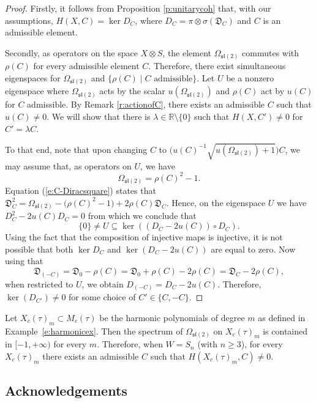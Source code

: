 \documentclass[pdftex]{sigma}
\numberwithin{equation}{section}
\newcommand{\fD}{\mathfrak{D}}
\newcommand{\bbr}{\mathbb{R}}
\begin{document}
\begin{proof}
Firstly, it follows from Proposition \ref{p:unitarycoh} that, with our assumptions, $H(X,C) = \ker D_C$, where $D_C = \pi\otimes\sigma(\fD_C)$ and $C$ is an admissible element.

Secondly, as operators on the space $X \otimes S$, the element $\Omega_{\mathfrak{sl}(2)}$ commutes with $\rho(C)$ for every admissible element $C$. Therefore, there exist simultaneous eigenspaces for $\Omega_{\mathfrak{sl}(2)}$ and $\{\rho(C) \mid C \text{ admissible}\}$. Let $U$ be a nonzero eigenspace where $\Omega_{\mathfrak{sl}(2)}$ acts by the scalar $u(\Omega_{\mathfrak{sl}(2)})$ and $\rho(C)$ act by $u(C)$ for $C$ admissible. By Remark \ref{r:actionofC}, there exists an admissible $C$ such that $u(C)\neq 0$. We will show that there is $\lambda \in \bbr\setminus \{0\}$ such that $H(X,C')\neq 0$ for $C' = \lambda C$.

To that end, note that upon changing $C$ to $\big(u(C)^{-1}\sqrt{u(\Omega_{\mathfrak{sl}(2)})+1}\big)C$, we may assume that, as operators on $U$, we have
\[\Omega_{\mathfrak{sl}(2)} = \rho(C)^2 -1.\]
Equation (\ref{e:C-Diracsquare}) states that $ \mathfrak{D}_{C}^2 = \Omega_{\mathfrak{sl}(2)} - \big(\rho(C)^2 - 1\big) + 2\rho(C)\mathfrak{D}_{C}$. Hence, on the eigenspace $U$ we have $ D_{C}^2 -2u(C)D_{C} = 0$ from which we conclude that
\[
\{0\}\neq U \subseteq \ker ((D_{C} -2u(C))\circ D_{C}).
\]
Using the fact that the composition of injective maps is injective, it is not possible that both $\ker D_{C}$ and $\ker (D_{C} -2u(C))$ are equal to
zero. Now using that
\[
\fD_{(-C)} = \fD_0 - \rho(C) = \fD_0 + \rho(C) -2\rho(C) = \fD_C - 2\rho(C),
\]
when restricted to $U$, we obtain $D_{(-C)} = D_{C} -2u(C)$. Therefore, $\ker(D_{C'}) \neq 0$ for some choice of $C' \in \{C,-C\}$.
\end{proof}

\begin{Example}
Let $X_c(\tau)_m \subset M_c(\tau)$ be the harmonic polynomials of degree $m$ as defined in Example~\ref{e:harmonicex}. Then the spectrum of $\Omega_{\mathfrak{sl}(2)}$ on $X_c(\tau)_m$ is contained in $[-1,+\infty)$ for every $m$. Therefore, when $W= S_n$ (with $n \geq 3$), for every $X_c(\tau)_m$ there exists an admissible $C$ such that $H(X_c(\tau)_m, C) \neq 0$.
\end{Example}

\subsection*{Acknowledgements}
\end{document}
